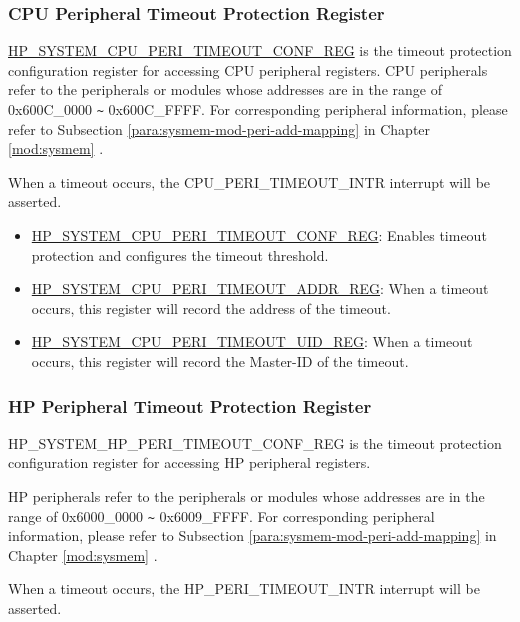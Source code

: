 \documentclass[main\_\_EN.tex]{subfiles}
\begin{document}
\subsubsection{CPU Peripheral Timeout Protection Register}

\hyperref[regdesc:HPSYSTEMCPUPERITIMEOUTCONFREG]{HP\_SYSTEM\_CPU\_PERI\_TIMEOUT\_CONF\_REG} is the timeout protection configuration register for accessing CPU peripheral registers.
CPU peripherals refer to the peripherals or modules whose addresses are in the range of 0x600C\_0000 \verb+~+ 0x600C\_FFFF. For corresponding peripheral information, please refer to Subsection \ref{para:sysmem-mod-peri-add-mapping} \textit{} in Chapter \ref{mod:sysmem} \textit{}.

When a timeout occurs, the CPU\_PERI\_TIMEOUT\_INTR interrupt will be asserted.

\begin{itemize}
    \item \hyperref[regdesc:HPSYSTEMCPUPERITIMEOUTCONFREG]{HP\_SYSTEM\_CPU\_PERI\_TIMEOUT\_CONF\_REG}: Enables timeout protection and configures the timeout threshold.
    \item \hyperref[regdesc:HPSYSTEMCPUPERITIMEOUTADDRREG]{HP\_SYSTEM\_CPU\_PERI\_TIMEOUT\_ADDR\_REG}:
    When a timeout occurs, this register will record the address of the timeout.
    \item \hyperref[regdesc:HPSYSTEMCPUPERITIMEOUTUIDREG]{HP\_SYSTEM\_CPU\_PERI\_TIMEOUT\_UID\_REG}:
    When a timeout occurs, this register will record the Master-ID of the timeout.
\end{itemize}


\subsubsection{HP Peripheral Timeout Protection Register}

HP\_SYSTEM\_HP\_PERI\_TIMEOUT\_CONF\_REG is the timeout protection configuration register for accessing HP peripheral registers.

HP peripherals refer to the peripherals or modules whose addresses are in the range of 0x6000\_0000 \verb+~+ 0x6009\_FFFF. For corresponding peripheral information, please refer to Subsection \ref{para:sysmem-mod-peri-add-mapping} \textit{} in Chapter \ref{mod:sysmem} \textit{}.

When a timeout occurs, the HP\_PERI\_TIMEOUT\_INTR interrupt will be asserted.
\end{document}
